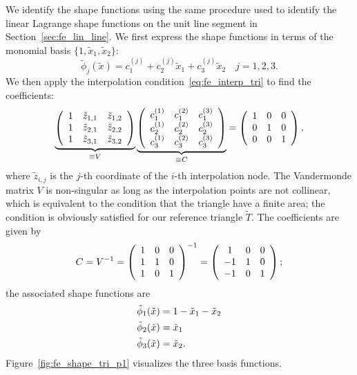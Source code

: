 We identify the shape functions using the same procedure used to identify the linear Lagrange shape functions on the unit line segment in Section~\ref{sec:fe_lin_line}. We first express the shape functions in terms of the monomial basis $\{ 1, \tilde x_1, \tilde x_2 \}$:
\begin{equation}
  \tilde \phi_j(\tilde x) = c^{(j)}_1 + c^{(j)}_2 \tilde x_1 + c_3^{(j)} \tilde x_2 \quad j = 1, 2, 3.
  \label{eq:fe_lin_tri_rep}
\end{equation}
We then apply the interpolation condition~\eqref{eq:fe_interp_tri} to find the coefficients: 
\begin{equation*}
  \underbrace{
   \bmat{ccc}
  1 & \tilde z_{1,1} & \tilde z_{1,2} \\
  1 & \tilde z_{2,1} & \tilde z_{2,2} \\
  1 & \tilde z_{3,1} & \tilde z_{3,2} \\
  \emat }_{\equiv V}
  \underbrace{ 
  \bmat{ccc}
  c_1^{(1)} & c_1^{(2)} & c_1^{(3)} \\
  c_2^{(1)} & c_2^{(2)} & c_2^{(3)} \\
  c_3^{(1)} & c_3^{(2)} & c_3^{(3)} \\
  \emat
  }_{\equiv C}
  =
  \bmat{ccc}
  1 & 0 & 0 \\
  0 & 1 & 0 \\
  0 & 0 & 1
  \emat,
\end{equation*}
where $\tilde z_{i,j}$ is the $j$-th coordinate of the $i$-th interpolation node. The Vandermonde matrix $V$ is non-singular as long as the interpolation points are not collinear, which is equivalent to the condition that the triangle have a finite area; the condition is obviously satisfied for our reference triangle $\tilde T$. The coefficients are given by 
\begin{equation*}
  C = V^{-1}
  = \bmat{ccc}
  1 & 0 & 0 \\
  1 & 1 & 0 \\
  1 & 0 & 1 
  \emat^{-1}
  = \bmat{ccc}
  1 & 0 & 0\\
  -1 & 1 & 0 \\
  -1 & 0 & 1
  \emat;
\end{equation*}
the associated shape functions are
\begin{align}
  \tilde \phi_1(\tilde x) &= 1 - \tilde x_1 - \tilde x_2 \notag \\
  \tilde \phi_2(\tilde x) &= \tilde x_1 \label{eq:fe_lin_tri_expl} \\
  \tilde \phi_3(\tilde x) &= \tilde x_2. \notag
\end{align}
Figure~\ref{fig:fe_shape_tri_p1} visualizes the three basis functions.

